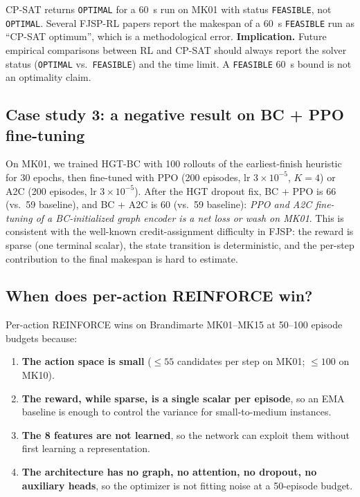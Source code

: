 \documentclass[preprint,review,3p,times,twocolumn]{elsarticle}
\begin{document}
CP-SAT returns \texttt{OPTIMAL} for a 60~s run on MK01 with
status \texttt{FEASIBLE}, not \texttt{OPTIMAL}. Several
FJSP-RL papers report the makespan of a 60~s
\texttt{FEASIBLE} run as ``CP-SAT optimum'', which is a
methodological error. \textbf{Implication.} Future
empirical comparisons between RL and CP-SAT should always
report the solver status (\texttt{OPTIMAL} vs.\
\texttt{FEASIBLE}) and the time limit. A \texttt{FEASIBLE}
60~s bound is not an optimality claim.

\subsection{Case study 3: a negative result on BC + PPO fine-tuning}
\label{sec:lessons-bc}

On MK01, we trained HGT-BC with 100 rollouts of the
earliest-finish heuristic for 30 epochs, then fine-tuned
with PPO (200 episodes, lr $3 \times 10^{-5}$, $K=4$) or
A2C (200 episodes, lr $3 \times 10^{-5}$). After the HGT
dropout fix, BC + PPO is 66 (vs.\ 59 baseline), and BC +
A2C is 60 (vs.\ 59 baseline): \emph{PPO and A2C fine-tuning
of a BC-initialized graph encoder is a net loss or wash on
MK01}. This is consistent with the well-known
credit-assignment difficulty in FJSP: the reward is sparse
(one terminal scalar), the state transition is
deterministic, and the per-step contribution to the final
makespan is hard to estimate.

\subsection{When does per-action REINFORCE win?}

Per-action REINFORCE wins on Brandimarte MK01--MK15 at
50--100 episode budgets because:
\begin{enumerate}[leftmargin=*]
  \item \textbf{The action space is small} ($\leq 55$
        candidates per step on MK01; $\leq 100$ on MK10).
  \item \textbf{The reward, while sparse, is a single
        scalar per episode}, so an EMA baseline is enough
        to control the variance for small-to-medium
        instances.
  \item \textbf{The 8 features are not learned}, so the
        network can exploit them without first learning a
        representation.
  \item \textbf{The architecture has no graph, no attention,
        no dropout, no auxiliary heads}, so the optimizer
        is not fitting noise at a 50-episode budget.
\end{enumerate}
\end{document}
